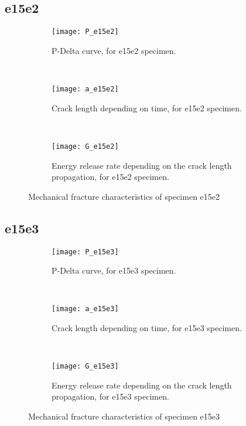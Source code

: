 \subsection{e15e2}

\begin{figure}[H]
	\centering
	\begin{subfigure}{0.48\linewidth}
		\centering
		\texttt{[image: P\_e15e2]}
		\decoRule
		\caption{P-Delta curve, for e15e2 specimen.}
		\label{fig:P_e15e2}
	\end{subfigure}
	\hfill \\
	\begin{subfigure}{0.48\linewidth}
		\centering
		\texttt{[image: a\_e15e2]}
		\decoRule
		\caption{Crack length depending on time, for e15e2 specimen.}
		\label{fig:a_e15e2}
	\end{subfigure}
	\hfill\\
	\begin{subfigure}{0.48\linewidth}
		\centering
		\texttt{[image: G\_e15e2]}
		\decoRule
		\caption{Energy release rate depending on the crack length propagation, for e15e2 specimen.}
		\label{fig:G_e15e2}
	\end{subfigure}
	\caption{Mechanical fracture characteristics of specimen e15e2}
	\label{e15e2}
\end{figure}

\subsection{e15e3}

\begin{figure}[H]
	\centering
	\begin{subfigure}{0.48\linewidth}
		\centering
		\texttt{[image: P\_e15e3]}
		\decoRule
		\caption{P-Delta curve, for e15e3 specimen.}
		\label{fig:P_e15e3}
	\end{subfigure}
	\hfill \\
	\begin{subfigure}{0.48\linewidth}
		\centering
		\texttt{[image: a\_e15e3]}
		\decoRule
		\caption{Crack length depending on time, for e15e3 specimen.}
		\label{fig:a_e15e3}
	\end{subfigure}
	\hfill\\
	\begin{subfigure}{0.48\linewidth}
		\centering
		\texttt{[image: G\_e15e3]}
		\decoRule
		\caption{Energy release rate depending on the crack length propagation, for e15e3 specimen.}
		\label{fig:G_e15e3}
	\end{subfigure}
	\caption{Mechanical fracture characteristics of specimen e15e3}
	\label{e15e3}
\end{figure}

